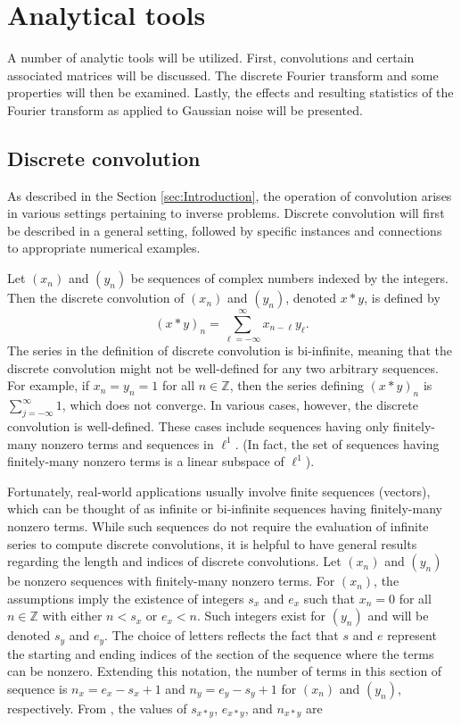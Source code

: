 \documentclass[12pt]{article}
\begin{document}
\section{Analytical tools} \label{sec:Analytical tools}

A number of analytic tools will be utilized. First, convolutions and certain associated matrices will be discussed. The discrete Fourier transform and some properties will then be examined. Lastly, the effects and resulting statistics of the Fourier transform as applied to Gaussian noise will be presented.

\subsection{Discrete convolution} \label{sec:Discrete convolution}
As described in the Section \ref{sec:Introduction}, the operation of convolution arises in various settings pertaining to inverse problems. Discrete convolution will first be described  in a general setting, followed by specific instances and connections to appropriate numerical examples. \par
Let $(x_n)$ and $(y_n)$ be sequences of complex numbers indexed by the integers. Then the discrete convolution of $(x_n)$ and $(y_n)$, denoted $x*y$, is defined by
\[(x*y)_n = \sum_{\ell=-\infty}^\infty x_{n-\ell}y_\ell.\]
The series in the definition of discrete convolution is bi-infinite, meaning that the discrete convolution might not be well-defined for any two arbitrary sequences. For example, if $x_n = y_n = 1$ for all $n \in \mathbb{Z}$, then the series defining $(x*y)_n$ is $\sum_{j=-\infty}^\infty 1$, which does not converge. In various cases, however, the discrete convolution is well-defined. These cases include sequences having only finitely-many nonzero terms and sequences in $\ell^1$. (In fact, the set of sequences having finitely-many nonzero terms is a linear subspace of $\ell^1$).  \par 
Fortunately, real-world applications usually involve finite sequences (vectors), which can be thought of as infinite or bi-infinite sequences having finitely-many nonzero terms. While such sequences do not require the evaluation of infinite series to compute discrete convolutions, it is helpful to have general results regarding the length and indices of discrete convolutions. Let $(x_n)$ and $(y_n)$ be nonzero sequences with finitely-many nonzero terms. For $(x_n)$, the assumptions imply the existence of integers $s_x$ and $e_x$ such that $x_n = 0$ for all $n \in \mathbb{Z}$ with either $n < s_x$ or $e_x < n$. Such integers exist for $(y_n)$ and will be denoted $s_y$ and $e_y$. The choice of letters reflects the fact that $s$ and $e$ represent the starting and ending indices of the section of the sequence where the terms can be nonzero. Extending this notation, the number of terms in this section of sequence is $n_x = e_x - s_x + 1$ and $n_y = e_y - s_y + 1$ for $(x_n)$ and $(y_n)$, respectively. From \cite{BoggessAlbert2001Afci}, the values of $s_{x*y}$, $e_{x*y}$, and $n_{x*y}$ are
\end{document}

